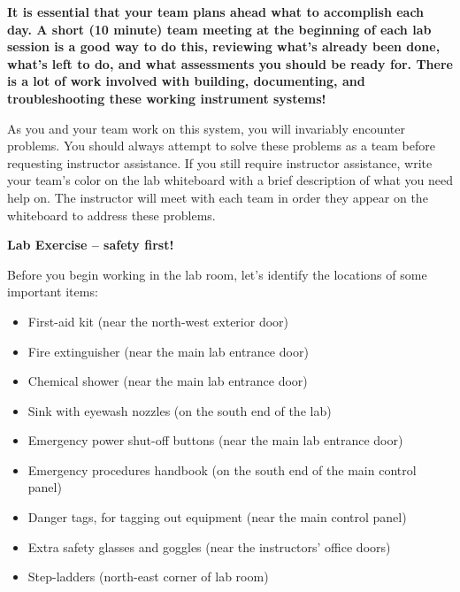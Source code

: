 \vskip 10pt

{\bf It is essential that your team plans ahead what to accomplish each day.  A short (10 minute) team meeting at the beginning of each lab session is a good way to do this, reviewing what's already been done, what's left to do, and what assessments you should be ready for.  There is a lot of work involved with building, documenting, and troubleshooting these working instrument systems!}

As you and your team work on this system, you will invariably encounter problems.  You should always attempt to solve these problems as a team before requesting instructor assistance.  If you still require instructor assistance, write your team's color on the lab whiteboard with a brief description of what you need help on.  The instructor will meet with each team in order they appear on the whiteboard to address these problems.











\vfil \eject

\noindent
{\bf Lab Exercise -- safety first!}

\vskip 30pt

\noindent
Before you begin working in the lab room, let's identify the locations of some important items:

\begin{itemize}
\item{} First-aid kit (near the north-west exterior door)
\vskip 10pt
\item{} Fire extinguisher (near the main lab entrance door)
\vskip 10pt
\item{} Chemical shower (near the main lab entrance door)
\vskip 10pt
\item{} Sink with eyewash nozzles (on the south end of the lab)
\vskip 10pt
\item{} Emergency power shut-off buttons (near the main lab entrance door)
\vskip 10pt
\item{} Emergency procedures handbook (on the south end of the main control panel)
\vskip 10pt
\item{} Danger tags, for tagging out equipment (near the main control panel)
\vskip 10pt
\item{} Extra safety glasses and goggles (near the instructors' office doors)
\vskip 10pt
\item{} Step-ladders (north-east corner of lab room)
\end{itemize}

